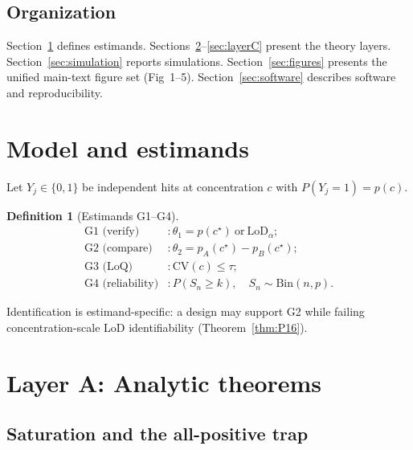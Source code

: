 \documentclass[11pt,a4paper]{article}
\theoremstyle{definition}
\newtheorem{definition}[theorem]{Definition}
\begin{document}
\subsection{Organization}

Section~\ref{sec:model} defines estimands.
Sections~\ref{sec:layerA}--\ref{sec:layerC} present the theory layers.
Section~\ref{sec:simulation} reports simulations.
Section~\ref{sec:figures} presents the unified main-text figure set (Fig~1--5).
Section~\ref{sec:software} describes software and reproducibility.

\section{Model and estimands}
\label{sec:model}

Let $Y_j\in\{0,1\}$ be independent hits at concentration $c$ with $P(Y_j=1)=p(c)$.

\begin{definition}[Estimands G1--G4]
\begin{align*}
  \text{G1 (verify)} &: \theta_1 = p(c^\star)\ \text{or}\ \mathrm{LoD}_\alpha; \\
  \text{G2 (compare)} &: \theta_2 = p_A(c^\star) - p_B(c^\star); \\
  \text{G3 (LoQ)} &: \mathrm{CV}(c) \le \tau; \\
  \text{G4 (reliability)} &: P(S_n \ge k),\quad S_n \sim \mathrm{Bin}(n,p).
\end{align*}
\end{definition}

Identification is estimand-specific: a design may support G2 while failing
concentration-scale LoD identifiability (Theorem~\ref{thm:P16}).

\section{Layer A: Analytic theorems}
\label{sec:layerA}

\subsection{Saturation and the all-positive trap}
\end{document}
